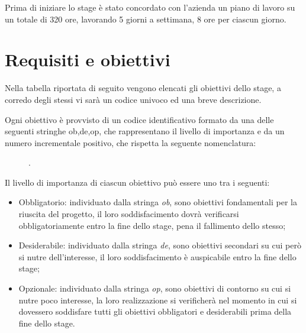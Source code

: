 Prima di iniziare lo stage è stato concordato con l'azienda un piano di lavoro su un totale di 320 ore, lavorando 5 giorni a settimana, 8 ore per ciascun giorno. 

\section{Requisiti e obiettivi}
Nella tabella riportata di seguito vengono elencati gli obiettivi dello stage, a corredo degli stessi vi sarà un codice univoco ed una breve descrizione.

Ogni obiettivo è provvisto di un codice identificativo formato da una delle seguenti stringhe ob,de,op, che rappresentano il livello di importanza e da un numero incrementale positivo, che rispetta la seguente nomenclatura: 
\begin{figure}[htp]
	\centering
	[importanza][identificativo].
\end{figure}

Il livello di importanza di ciascun obiettivo può essere uno tra i seguenti:
\begin{itemize}
	\item Obbligatorio: individuato dalla stringa \textit{ob}, sono obiettivi fondamentali per la riuscita del progetto, il loro soddisfacimento dovrà verificarsi obbligatoriamente entro la fine dello stage, pena il fallimento dello stesso;
	\item Desiderabile: individuato dalla stringa \textit{de}, sono obiettivi secondari su cui però si nutre dell'interesse, il loro soddisfacimento è auspicabile entro la fine dello stage;
	\item Opzionale: individuato dalla stringa \textit{op}, sono obiettivi di contorno su cui si nutre poco interesse, la loro realizzazione si verificherà nel momento in cui si dovessero soddisfare tutti gli obiettivi obbligatori e desiderabili prima della fine dello stage.
\end{itemize}

